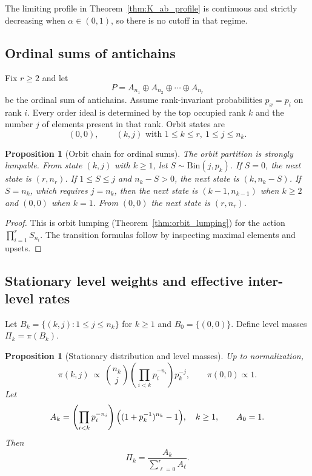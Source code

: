 \documentclass[final,3p,times]{elsarticle}
\newtheorem{proposition}[theorem]{Proposition}
\theoremstyle{definition}
\begin{document}
The limiting profile in Theorem~\ref{thm:K_ab_profile} is continuous and strictly decreasing when $\alpha\in(0,1)$, so there is no cutoff in that regime.

\subsection{Ordinal sums of antichains}

Fix $r\ge 2$ and let
\[
P = A_{n_1}\oplus A_{n_2}\oplus\cdots\oplus A_{n_r}
\]
be the ordinal sum of antichains.
Assume rank-invariant probabilities $p_x=p_i$ on rank $i$.
Every order ideal is determined by the top occupied rank $k$ and the number $j$ of elements present in that rank.
Orbit states are
\[
(0,0),\qquad (k,j)\text{ with }1\le k\le r,\ 1\le j\le n_k.
\]

\begin{proposition}[Orbit chain for ordinal sums]\label{prop:ordinal_orbit_chain}
The orbit partition is strongly lumpable.
From state $(k,j)$ with $k\ge 1$, let $S\sim \mathrm{Bin}(j,p_k)$.
If $S=0$, the next state is $(r,n_r)$.
If $1\le S\le j$ and $n_k-S>0$, the next state is $(k,n_k-S)$.
If $S=n_k$, which requires $j=n_k$, then the next state is $(k-1,n_{k-1})$ when $k\ge 2$ and $(0,0)$ when $k=1$.
From $(0,0)$ the next state is $(r,n_r)$.
\end{proposition}

\begin{proof}
This is orbit lumping (Theorem~\ref{thm:orbit_lumping}) for the action $\prod_{i=1}^r S_{n_i}$.
The transition formulas follow by inspecting maximal elements and upsets.
\end{proof}

\subsection{Stationary level weights and effective inter-level rates}

Let $B_k=\{(k,j):1\le j\le n_k\}$ for $k\ge 1$ and $B_0=\{(0,0)\}$.
Define level masses $\Pi_k=\pi(B_k)$.

\begin{proposition}[Stationary distribution and level masses]\label{prop:ordinal_stationary_levels}
Up to normalization,
\[
\pi(k,j)\ \propto\ \binom{n_k}{j}\left(\prod_{i<k}p_i^{-n_i}\right)p_k^{-j},
\qquad
\pi(0,0)\propto 1.
\]
Let
\[
A_k=\left(\prod_{i<k}p_i^{-n_i}\right)\Bigl((1+p_k^{-1})^{n_k}-1\Bigr),\quad k\ge 1,
\qquad
A_0=1.
\]
Then
\[
\Pi_k = \frac{A_k}{\sum_{\ell=0}^r A_\ell}.
\]
\end{proposition}
\end{document}

